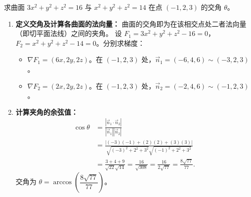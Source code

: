 \documentclass[lang=cn,11pt]{elegantbook}
\begin{document}
\begin{exercise}[求两曲面交角]
求曲面 $3x^2+y^2+z^2=16$ 与 $x^2+y^2+z^2=14$ 在点 $(-1,2,3)$ 的交角 $\theta$。
\end{exercise}
\begin{solution}
\begin{enumerate}
    \item \textbf{定义交角及计算各曲面的法向量：}
    曲面的交角即为在该相交点处二者法向量（即切平面法线）之间的夹角。
    设 $F_1 = 3x^2+y^2+z^2-16 = 0$，$F_2 = x^2+y^2+z^2-14 = 0$。分别求梯度：
    \begin{itemize}
        \item $\nabla F_1 = (6x, 2y, 2z)$。在 $(-1,2,3)$ 处，$\vec{n}_1 = (-6, 4, 6) \sim (-3, 2, 3)$。
        \item $\nabla F_2 = (2x, 2y, 2z)$。在 $(-1,2,3)$ 处，$\vec{n}_2 = (-2, 4, 6) \sim (-1, 2, 3)$。
    \end{itemize}

    \item \textbf{计算夹角的余弦值：}
    \begin{align*}
    \cos\theta &= \frac{|\vec{n}_1 \cdot \vec{n}_2|}{|\vec{n}_1| |\vec{n}_2|} \\
    &= \frac{|(-3)(-1) + (2)(2) + (3)(3)|}{\sqrt{(-3)^2+2^2+3^2} \sqrt{(-1)^2+2^2+3^2}} \\
    &= \frac{3+4+9}{\sqrt{22} \sqrt{14}} = \frac{16}{\sqrt{308}} = \frac{16}{2\sqrt{77}} = \frac{8\sqrt{77}}{77}.
    \end{align*}
    交角为 $\theta = \arccos\left(\dfrac{8\sqrt{77}}{77}\right)$。
\end{enumerate}
\end{solution}
\end{document}

